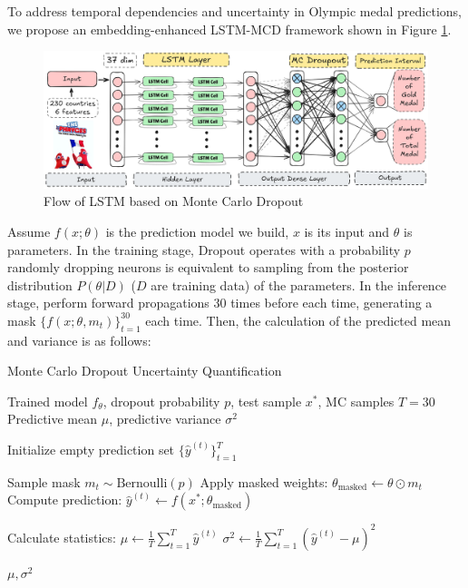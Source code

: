 \documentclass{mcmthesis}
\begin{document}
To address temporal dependencies and uncertainty in Olympic medal predictions, we propose an embedding-enhanced LSTM-MCD framework shown in Figure \ref{fig:LSTM-MCD}. 
	\begin{figure}[H]
	\centering
	\includegraphics[width=1\linewidth]{fig/LSTM-MCD.png}
	\caption{Flow of LSTM based on Monte Carlo Dropout}
	\label{fig:LSTM-MCD}
\end{figure}
  Assume $f(x;\theta)$ is the prediction model we build, $x$ is its input and $\theta$ is parameters. In the training stage, Dropout operates with a probability $p$
randomly dropping neurons is equivalent to sampling from the posterior distribution $P(\theta|D)$ ($D$ are training data) of the parameters. In the inference stage, perform forward propagations $30$ times before each time, generating a mask $\{f(x;\theta,m_t)\}_{t=1}^{30}$ each time. Then, the calculation of the predicted mean and variance is as follows:
\begin{algorithm}
	\caption{Monte Carlo Dropout Uncertainty Quantification}
	\begin{algorithmic}[1]
		\Require Trained model $f_\theta$, dropout probability $p$, test sample $x^*$, MC samples $T=30$
		\Ensure Predictive mean $\mu$, predictive variance $\sigma^2$
		
		\State Initialize empty prediction set $\{\hat{y}^{(t)}\}_{t=1}^T$
		
		\State Sample mask $m_t \sim \text{Bernoulli}(p)$ 
		\State Apply masked weights: $\theta_{\text{masked}} \gets \theta \odot m_t$
		\State Compute prediction: $\hat{y}^{(t)} \gets f(x^*; \theta_{\text{masked}})$
		\EndFor
		
		\State Calculate statistics:
		\State $\mu \gets \frac{1}{T}\sum_{t=1}^T \hat{y}^{(t)}$ 
		\State $\sigma^2 \gets \frac{1}{T}\sum_{t=1}^T (\hat{y}^{(t)} - \mu)^2$ 
		\EndFor
		
		\State \Return $\mu, \sigma^2$
	\end{algorithmic}
\end{algorithm}
\end{document}
